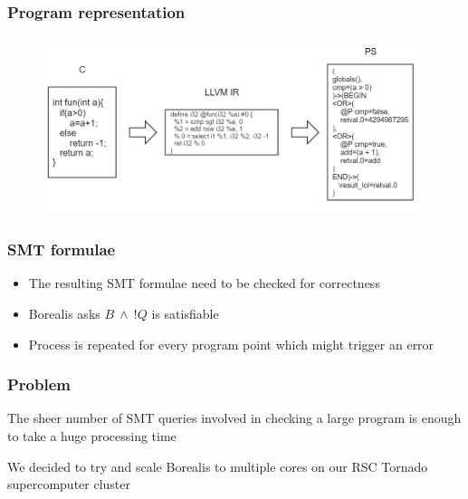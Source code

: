 
\begin{frame}
	\frametitle{Program representation}
	\begin{figure}
	\includegraphics[width=110mm, keepaspectratio]{image/PSdef}
	\end{figure}
\end{frame}


\begin{frame}
	\frametitle{SMT formulae}
\begin{itemize}
	\item The resulting SMT formulae need to be checked for correctness
	\item Borealis asks $B \ \wedge \ !Q$ is satisfiable
	\item Process is repeated for every program point which might trigger an error
\end{itemize}
\end{frame}


\begin{frame}
\frametitle{Problem}
\begin{block}{}
	\centering
	The sheer number of SMT queries involved in checking a large program is enough to take a huge processing time
\end{block}


\begin{block}{}
	\centering
	We decided to try and scale Borealis to multiple cores on our RSC Tornado supercomputer cluster
\end{block}
\end{frame}

